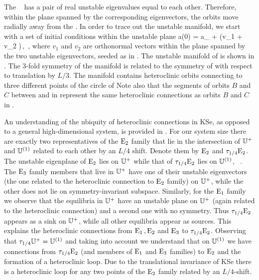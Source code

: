 The \eqv\  has a pair of real unstable eigenvalues
equal to each other.  Therefore, within the plane spanned by the
corresponding eigenvectors, the orbits move radially away from
the \eqv.  In order to trace out the unstable manifold,
we start with a set of initial conditions within the unstable plane
\beq
 a(0) = a_{{}} + \epsilon(v_1 \cos \phi + v_2 \sin \phi)\,,
  \quad\phi\in[0,2\pi]\,,
\label{unsManSeed}
\eeq
where $v_1$ and $v_2$ are orthonormal vectors within the
plane spanned by the two unstable eigenvectors, seeded as in
.
  The unstable manifold
of  is shown in .  The 3-fold symmetry of
the manifold is related to the symmetry of  with respect to
translation by $L/3$.  The manifold contains heteroclinic orbits
connecting  to three different points of the circle of {\eqva}
Note also that the segments of orbits $B$ and $C$
between  and  in 
represent the same heteroclinic connections as orbits $B$ and $C$ in
.

An understanding of the ubiquity of heteroclinic connections in KSe, as
opposed to a general high-dimensional system, is provided in .
For our system size
there are exactly two representatives
of the $\mathrm{E}_{2}$ family that lie in the intersection of $\mathbb{U}^+$ and $\mathbb{U}^{(1)}$ related
to each other by an $L/4$ shift. Denote them by $\mathrm{E}_{2}$ and $\tau_{1/4}\mathrm{E}_{2}$. The unstable eigenplane of
$\mathrm{E}_{2}$ lies on $\mathbb{U}^+$ while that of $\tau_{1/4}\mathrm{E}_{2}$ lies on $\mathbb{U}^{(1)}$, \cf\ .
The $\mathrm{E}_{3}$ family members that live in $\mathbb{U}^+$ have one of their unstable eigenvectors (the one related to the heteroclinic
connection to $\mathrm{E}_{2}$ family)  on $\mathbb{U}^+$, while the other does not lie on symmetry-invariant subspace.
Similarly, for the $\mathrm{E}_{1}$ family we observe that the equilibria in $\mathbb{U}^+$ have
an unstable plane on $\mathbb{U}^+$ (again related to the heteroclinic connection) and a second one with no symmetry.
Thus $\tau_{1/4}\mathrm{E}_{2}$ appears as a sink on $\mathbb{U}^+$, while all other equilibria appear as sources.
This explains the heteroclinic connections from $\mathrm{E}_{1}\,,\mathrm{E}_{2}$ and $\mathrm{E}_{3}$ to $\tau_{1/4}\mathrm{E}_{2}$.
Observing that $\tau_{1/4} \mathbb{U}^+= \mathbb{U}^{(1)}$ and taking into account  we understand that on $\mathbb{U}^{(1)}$
we have connections from $\tau_{1/4}\mathrm{E}_{2}$ (and members of $\mathrm{E}_{1}$ and $\mathrm{E}_{3}$ families) to $\mathrm{E}_{2}$ and the
formation of a heteroclinic loop.
Due to the translational invariance of KSe there is
a heteroclinic loop for any two points
of the $\mathrm{E}_{2}$ family related by an $L/4$-shift.

